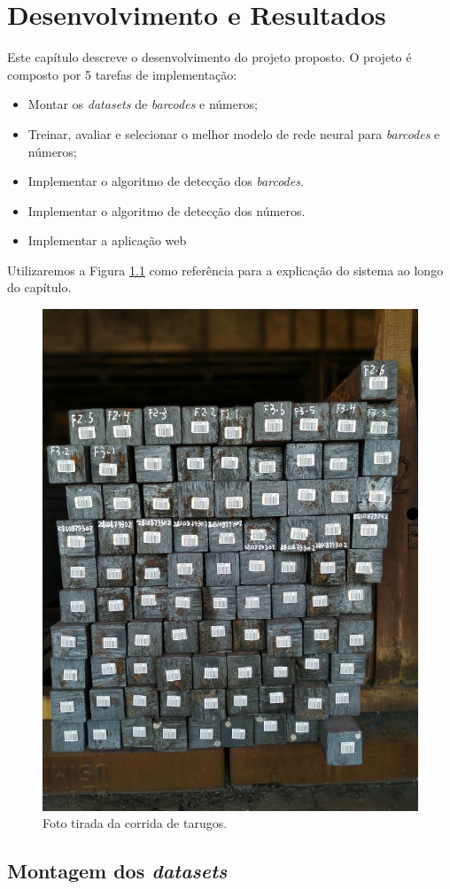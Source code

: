 
\chapter{Desenvolvimento e Resultados}

Este capítulo descreve o desenvolvimento do projeto proposto. O projeto é composto por 5 tarefas de implementação:

\begin{itemize}
    \item Montar os \textit{datasets} de \textit{barcodes} e números;
    \item Treinar, avaliar e selecionar o melhor modelo de rede neural para \textit{barcodes} e números;
    \item Implementar o algoritmo de detecção dos \textit{barcodes}.
    \item Implementar o algoritmo de detecção dos números.
    \item Implementar a aplicação web
\end{itemize}

Utilizaremos a Figura \ref{fig:imagemBase} como referência para a explicação do sistema ao longo do capítulo.

\begin{figure}[h!]
	\centering
	\includegraphics[width=0.5\linewidth]{figuras/img1.jpg}
	\caption{Foto tirada da corrida de tarugos.}
	\label{fig:imagemBase}
\end{figure}

\section{Montagem dos \textit{datasets}}


